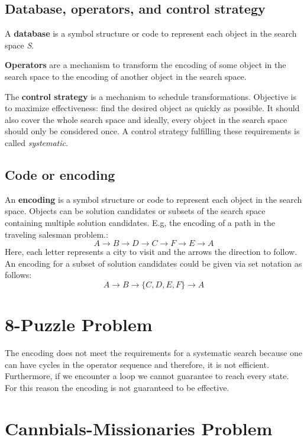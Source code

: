\documentclass[11pt]{article}
\begin{document}
\subsection{Database, operators, and control strategy}
A \textbf{database} is a symbol structure or code to represent each object in the search space \emph{S}.

\textbf{Operators} are a mechanism to transform the encoding of some object in the search space to the encoding of another object in the search space.

The \textbf{control strategy} is a mechanism to schedule transformations. Objective is to maximize effectiveness: find the desired object as quickly as possible. It should also cover the whole search space and ideally, every object in the search space should only be considered once. A control strategy fulfilling these requirements is called \emph{systematic}. 

\subsection{Code or encoding}
An \textbf{encoding} is a symbol structure or code to represent each object in the search space. Objects can be solution candidates or subsets of the search space containing multiple solution candidates. E.g, the encoding of a path in the traveling salesman problem.:
\begin{equation*}
A \rightarrow B \rightarrow D \rightarrow C \rightarrow F \rightarrow E \rightarrow A
\end{equation*}
Here, each letter represents a city to visit and the arrows the direction to follow. An encoding for a subset of solution candidates could be given via set notation as follows:
\begin{equation*}
A \rightarrow B \rightarrow \{C,D,E,F\} \rightarrow A
\end{equation*}

\section{8-Puzzle Problem}
The encoding does not meet the requirements for a systematic search because one can have cycles in the operator sequence and therefore, it is not efficient. Furthermore, if we encounter a loop we cannot guarantee to reach every state. For this reason the encoding is not guaranteed to be effective.

\setcounter{section}{6}
\section{Cannbials-Missionaries Problem}
\end{document}
